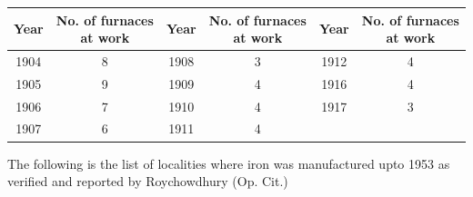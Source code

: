 {\fontsize{7}{9}\selectfont\begin{center}
\begin{tabular}{|c|c|c|c|c|c|}
\hline
\multicolumn{1}{|m{.5cm}|}{\textbf{Year}} & \multicolumn{1}{m{1.5cm}|}{\centering \textbf{No. of furnaces at work}} & 
\multicolumn{1}{m{.5cm}|}{\textbf{Year}} & \multicolumn{1}{m{1.5cm}|}{\centering \textbf{No. of furnaces at work}} & 
\multicolumn{1}{m{.5cm}|}{\textbf{Year}} & \multicolumn{1}{m{1.5cm}|}{\centering \textbf{No. of furnaces at work}}\\
\hline
1904 & 8 & 1908 & 3 & 1912 & 4\\
1905 & 9 & 1909 & 4 & 1916 & 4\\
1906 & 7 & 1910 & 4 & 1917 & 3\\
1907 & 6 & 1911 & 4 &  & \\
\hline
\end{tabular}
\end{center}}


The following is the list of localities where iron was manufactured upto 1953 as verified and reported by Roychowdhury (Op. Cit.) 

